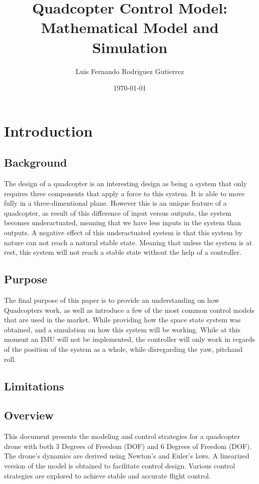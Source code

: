 \documentclass[a4paper,12pt]{report}
\begin{document}
\title{Quadcopter Control Model: Mathematical Model and Simulation}
\author{Luis Fernando Rodriguez Gutierrez}
\date{\today}
\maketitle

\tableofcontents

\chapter{Introduction}

\section{Background}
The design of a quadcopter is an interesting design as being a system that only requires three components that apply a force to this system.
It is able to move fully in a three-dimentional plane. However this is an unique feature of a quadcopter, as result of this difference of input versus outputs, the system becomes underactuated, meaning that we have less inputs in the system than outputs.
A negative effect of this underactuated system is that this system by nature can not reach a natural stable state. Meaning that unless the system is at rest, this system will not reach a stable state without the help of a controller.
\section{Purpose}
The final purpose of this paper is to provide an understanding on how Quadcopters work, as well as introduce a few of the most common control models that are used in the market.
While providing how the space state system was obtained, and a simulation on how this system will be working. While at this moment an IMU will not be implemented, the controller will only work in regards of the position of the system as a whole, while disregarding the yaw, pitchand roll.

\section{Limitations}
\section{Overview}
This document presents the modeling and control strategies for a quadcopter drone with both 3 Degrees of Freedom (DOF) and 6 Degrees of Freedom (DOF).
The drone's dynamics are derived using Newton's and Euler's laws.
A linearized version of the model is obtained to facilitate control design.
Various control strategies are explored to achieve stable and accurate flight control.
\end{document}
